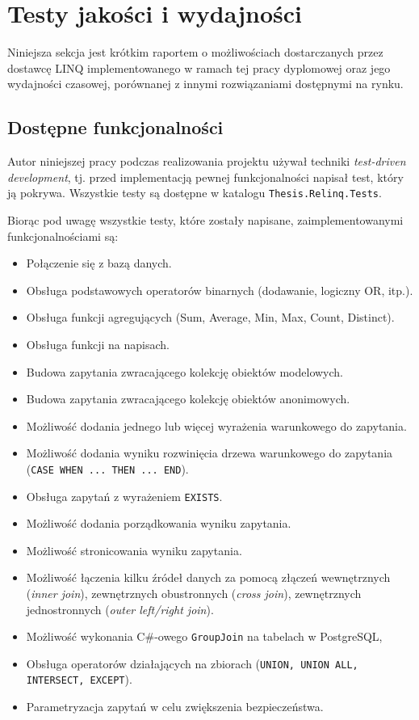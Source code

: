 \chapter{Testy jakości i wydajności}
Niniejsza sekcja jest krótkim raportem o możliwościach dostarczanych przez dostawcę LINQ implementowanego w ramach tej pracy dyplomowej oraz jego wydajności czasowej, porównanej z innymi rozwiązaniami dostępnymi na rynku.

\section{Dostępne funkcjonalności}
Autor niniejszej pracy podczas realizowania projektu używał techniki \textit{test-driven development}, tj. przed implementacją pewnej funkcjonalności napisał test, który ją pokrywa. Wszystkie testy są dostępne w katalogu \texttt{Thesis.Relinq.Tests}.

Biorąc pod uwagę wszystkie testy, które zostały napisane, zaimplementowanymi funkcjonalnościami są:

\begin{itemize}
\setlength\itemsep{0em}
\item Połączenie się z bazą danych.
\item Obsługa podstawowych operatorów binarnych (dodawanie, logiczny OR, itp.).
\item Obsługa funkcji agregujących (Sum, Average, Min, Max, Count, Distinct).
\item Obsługa funkcji na napisach.
\item Budowa zapytania zwracającego kolekcję obiektów modelowych.
\item Budowa zapytania zwracającego kolekcję obiektów anonimowych.
\item Możliwość dodania jednego lub więcej wyrażenia warunkowego do zapytania.
\item Możliwość dodania wyniku rozwinięcia drzewa warunkowego do zapytania \linebreak (\texttt{CASE WHEN ... THEN ... END}).
\item Obsługa zapytań z wyrażeniem \texttt{EXISTS}.
\item Możliwość dodania porządkowania wyniku zapytania.
\item Możliwość stronicowania wyniku zapytania.
\item Możliwość łączenia kilku źródeł danych za pomocą złączeń wewnętrznych \linebreak (\textit{inner join}), zewnętrznych obustronnych (\textit{cross join}), zewnętrznych jednostronnych (\textit{outer left/right join}).
\item Możliwość wykonania C\#-owego \texttt{GroupJoin} na tabelach w PostgreSQL,
\item Obsługa operatorów działających na zbiorach (\texttt{UNION, UNION ALL, \linebreak INTERSECT, EXCEPT}).
\item Parametryzacja zapytań w celu zwiększenia bezpieczeństwa.
\end{itemize}

